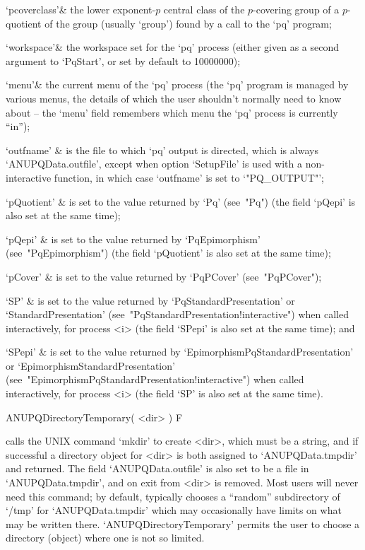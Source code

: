 \quad`pcoverclass'&  the  lower  exponent-$p$  central   class   of   the
$p$-covering group of a $p$-quotient of the group (usually `group') found
by a call to the `pq' program;

\quad`workspace'& the workspace set for the `pq' process (either given as
a second argument to `PqStart', or set by default to 10000000);

\quad`menu'& the current menu of the `pq' process  (the  `pq'  program  is
managed by various  menus,  the  details  of  which  the  user  shouldn't
normally need to know about -- the `menu' field remembers which menu  the
`pq' process is currently ``in'');

\quad`outfname' & is the file to which `pq' output is directed, which  is
always `ANUPQData.outfile', except when option `SetupFile' is used with a
non-interactive  function,  in  which   case   `outfname'   is   set   to
`"PQ_OUTPUT"';

\quad`pQuotient' & is set to the value returned by `Pq'  (see~"Pq")  (the
field `pQepi' is also set at the same time);

\quad`pQepi'  &  is  set  to  the  value  returned   by   `PqEpimorphism'
(see~"PqEpimorphism") (the field `pQuotient' is  also  set  at  the  same
time);

\quad`pCover'  &  is  set   to   the   value   returned   by   `PqPCover'
(see~"PqPCover");

\quad`SP' & is set to the value returned by  `PqStandardPresentation'  or
`StandardPresentation'  (see~"PqStandardPresentation!interactive")   when
called interactively, for process <i> (the field `SPepi' is also  set  at
the same time); and

\quad`SPepi'    &    is    set    to    the     value     returned     by
`EpimorphismPqStandardPresentation' or  `EpimorphismStandardPresentation'
(see~"EpimorphismPqStandardPresentation!interactive")     when     called
interactively, for process <i> (the field `SP' is also set  at  the  same
time).

\enditems

\>ANUPQDirectoryTemporary( <dir> ) F

calls the UNIX command `mkdir' to create <dir>, which must be  a  string,
and if successful a directory  object  for  <dir>  is  both  assigned  to
`ANUPQData.tmpdir' and returned. The field  `ANUPQData.outfile'  is  also
set to be a file in `ANUPQData.tmpdir', and on exit from {\GAP} <dir>  is
removed. Most users will never need  this  command;  by  default,  {\GAP}
typically   chooses   a   ``random''   subdirectory   of    `/tmp'    for
`ANUPQData.tmpdir' which may occasionally have  limits  on  what  may  be
written there. `ANUPQDirectoryTemporary' permits the  user  to  choose  a
directory (object) where one is not so limited.

